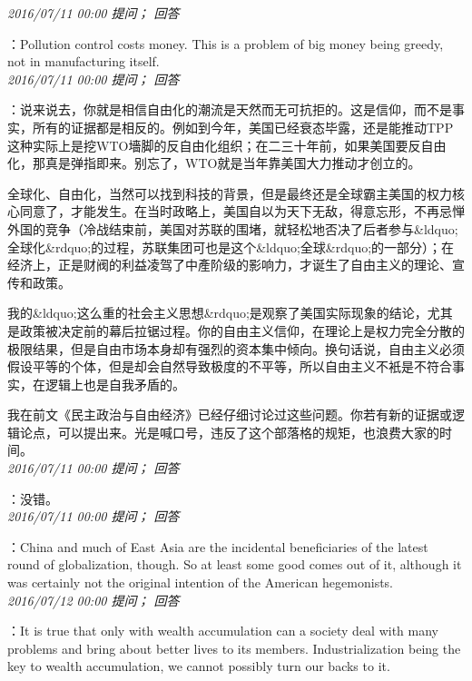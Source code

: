 \documentclass[twocolumn]{ctexart}
\begin{document}
\textit{\hfill\noindent\small 2016/07/11 00:00 提问； 回答}

：Pollution control costs money. This is a problem of big money being greedy, not in manufacturing itself.\\

\textit{\hfill\noindent\small 2016/07/11 00:00 提问； 回答}

：说来说去，你就是相信自由化的潮流是天然而无可抗拒的。这是信仰，而不是事实，所有的证据都是相反的。例如到今年，美国已经衰态毕露，还是能推动TPP这种实际上是挖WTO墻脚的反自由化组织；在二三十年前，如果美国要反自由化，那真是弹指即来。别忘了，WTO就是当年靠美国大力推动才创立的。

全球化、自由化，当然可以找到科技的背景，但是最终还是全球霸主美国的权力核心同意了，才能发生。在当时政略上，美国自以为天下无敌，得意忘形，不再忌惮外国的竞争（冷战结束前，美国对苏联的围堵，就轻松地否决了后者参与\&ldquo;全球化\&rdquo;的过程，苏联集团可也是这个\&ldquo;全球\&rdquo;的一部分）；在经济上，正是财阀的利益凌驾了中產阶级的影响力，才诞生了自由主义的理论、宣传和政策。

我的\&ldquo;这么重的社会主义思想\&rdquo;是观察了美国实际现象的结论，尤其是政策被决定前的幕后拉锯过程。你的自由主义信仰，在理论上是权力完全分散的极限结果，但是自由市场本身却有强烈的资本集中倾向。换句话说，自由主义必须假设平等的个体，但是却会自然导致极度的不平等，所以自由主义不衹是不符合事实，在逻辑上也是自我矛盾的。

我在前文《民主政治与自由经济》已经仔细讨论过这些问题。你若有新的证据或逻辑论点，可以提出来。光是喊口号，违反了这个部落格的规矩，也浪费大家的时间。\\

\textit{\hfill\noindent\small 2016/07/11 00:00 提问； 回答}

：没错。\\

\textit{\hfill\noindent\small 2016/07/11 00:00 提问； 回答}

：China and much of East Asia are the incidental beneficiaries of the latest round of globalization, though. So at least some good comes out of it, although it was certainly not the original intention of the American hegemonists.\\

\textit{\hfill\noindent\small 2016/07/12 00:00 提问； 回答}

：It is true that only with wealth accumulation can a society deal with many problems and bring about better lives to its members. Industrialization being the key to wealth accumulation, we cannot possibly turn our backs to it.
\end{document}
